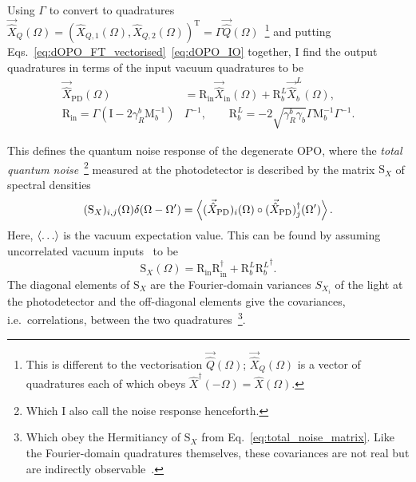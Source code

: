 Using $\Gamma$ to convert to quadratures $\vec{\hat{X}}_Q(\Omega)=(\hat{X}_{Q,1}(\Omega),\hat{X}_{Q,2}(\Omega))^\text{T}=\Gamma \vec{\hat{Q}}(\Omega)$~\footnote{This is different to the vectorisation $\vec{\hat{Q}}(\Omega)$; $\vec{\hat{X}}_Q(\Omega)$ is a vector of quadratures each of which obeys $\hat{X}^\dag(-\Omega)=\hat{X}(\Omega)$.} and putting Eqs.~\ref{eq:dOPO_FT_vectorised}~\ref{eq:dOPO_IO} together, I find the output quadratures in terms of the input vacuum quadratures to be
\begin{align}
\label{eq:dOPO_PD_as_fn_of_vac}
\vec{\hat X}_\mathrm{PD}(\Omega)&=\text{R}_\text{in}\vec{\hat X}_\mathrm{in}(\Omega)+\text{R}^L_b\vec{\hat X}^L_b(\Omega),\\
\text{R}_\text{in}=\Gamma\left(\text{I}-2\gamma^b_R\text{M}_b^{-1}\right)&\Gamma^{-1}, \qquad \text{R}^L_b=-2\sqrt{\gamma^b_R \gamma_b}\Gamma\text{M}_b^{-1}\Gamma^{-1}. %
\end{align}

This defines the quantum noise response of the degenerate OPO, where the \emph{total quantum noise}~\footnote{Which I also call the noise response henceforth.} measured at the photodetector is described by the matrix $\text{S}_X$ of spectral densities 
\begin{equation}\label{eq:total_noise_matrix}
(\text{S}_X)_{i,j}(\Omega)\delta(\Omega-\Omega')=\ev{(\vec{\hat X}_\text{PD})_i(\Omega)\circ(\vec{\hat X}_\text{PD})_j^\dag(\Omega')}.
\end{equation}
Here, $\ev{\ldots}$ is the vacuum expectation value. This can be found by assuming uncorrelated vacuum inputs~\cite{danilishinQuantumMeasurementTheory2012} to be
\begin{equation}\label{eq:dOPO_Sx_abstract}
\text{S}_X(\Omega)=\text{R}_\text{in} \text{R}_\text{in}^\dag+\text{R}^L_b {\text{R}^L_b}^\dag. %
\end{equation}
The diagonal elements of $\text{S}_X$ are the Fourier-domain variances $S_{X_i}$ of the light at the photodetector and the off-diagonal elements give the covariances, i.e.\ correlations, between the two quadratures~\footnote{Which obey the Hermitiancy of $\text{S}_X$ from Eq.~\ref{eq:total_noise_matrix}. Like the Fourier-domain quadratures themselves, these covariances are not real but are indirectly observable~\cite{reidDemonstrationEinsteinPodolskyRosenParadox1989}.}.

